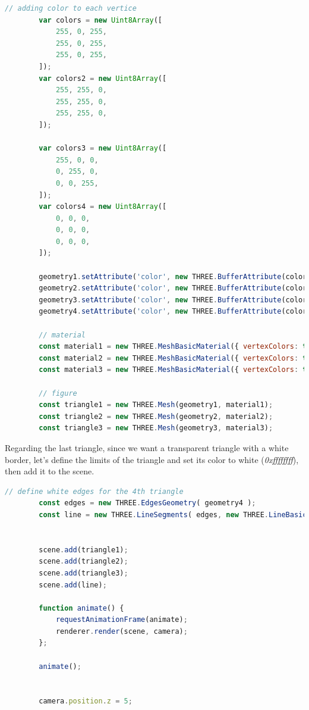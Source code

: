 \documentclass{article}
\begin{document}
\begin{lstlisting}[language=JavaScript, caption=Setting color.]
         // adding color to each vertice
        var colors = new Uint8Array([
            255, 0, 255,
            255, 0, 255,
            255, 0, 255,
        ]);
        var colors2 = new Uint8Array([
            255, 255, 0,
            255, 255, 0,
            255, 255, 0,
        ]);

        var colors3 = new Uint8Array([
            255, 0, 0,
            0, 255, 0,
            0, 0, 255,
        ]);
        var colors4 = new Uint8Array([
            0, 0, 0,
            0, 0, 0,
            0, 0, 0,
        ]);
        
        geometry1.setAttribute('color', new THREE.BufferAttribute(colors, 3, true));
        geometry2.setAttribute('color', new THREE.BufferAttribute(colors2, 3, true));
        geometry3.setAttribute('color', new THREE.BufferAttribute(colors3, 3, true));
        geometry4.setAttribute('color', new THREE.BufferAttribute(colors4, 3, true));

        // material
        const material1 = new THREE.MeshBasicMaterial({ vertexColors: true, side: THREE.DoubleSide });
        const material2 = new THREE.MeshBasicMaterial({ vertexColors: true, side: THREE.DoubleSide });
        const material3 = new THREE.MeshBasicMaterial({ vertexColors: true, side: THREE.DoubleSide });

		// figure
        const triangle1 = new THREE.Mesh(geometry1, material1);
        const triangle2 = new THREE.Mesh(geometry2, material2);
        const triangle3 = new THREE.Mesh(geometry3, material3);
\end{lstlisting}

Regarding the last triangle, since we want a transparent triangle with a white border, let's define the limits of the triangle and set its color to white (\textit{0xffffffff}), then add it to the scene.


\begin{lstlisting}[language=JavaScript, caption=Define edges.]
        // define white edges for the 4th triangle
		const edges = new THREE.EdgesGeometry( geometry4 );
		const line = new THREE.LineSegments( edges, new THREE.LineBasicMaterial( { color: 0xffffff } ) );


        scene.add(triangle1);
        scene.add(triangle2);
        scene.add(triangle3);
        scene.add(line);

        function animate() {
            requestAnimationFrame(animate);
            renderer.render(scene, camera);
        };

        animate();


        camera.position.z = 5;
\end{lstlisting}
\end{document}
